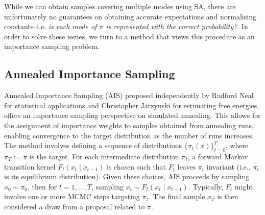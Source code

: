 While we can obtain samples covering multiple modes using SA, there are unfortunately no guarantees on obtaining accurate expectations and normalising constants--i.e. \emph{is each mode of $\pi$ is represented with the correct probability?}. In order to solve these issues, we turn to a method that views this procedure as an importance sampling problem.

\subsection{Annealed Importance Sampling}
\label{sec:ais}
Annealed Importance Sampling (AIS) \parencite{neal2001annealed,jarzynski1997equilibrium,jarzynski1997nonequilibrium} proposed independently by Radford Neal for statistical applications and Christopher Jarzynski for estimating free energies, offers an importance sampling perspective on simulated annealing. This allows for the assignment of importance weights to samples obtained from annealing runs, enabling convergence to the target distribution as the number of runs increases. 
The method involves defining a sequence of distributions $\{\pi_t(x)\}_{t=0}^T$, where $\pi_T := \pi$ is the target. For each intermediate distribution $\pi_t$, a forward Markov transition kernel $F_t\left(x_t \mid x_{t-1}\right)$ is chosen such that $F_t$ leaves $\pi_t$ invariant (i.e., $\pi_t$ is its equilibrium distribution). Given these choices, AIS proceeds by sampling $x_0 \sim \pi_0$, then for $t=1, \ldots, T$, sampling $x_t \sim F_t\left(x_t \mid x_{t-1}\right)$. Typically, $F_t$ might involve one or more MCMC steps targeting $\pi_t$. The final sample $x_T$ is then considered a draw from a proposal related to $\pi$.\label{ntn:transition_kernels}

